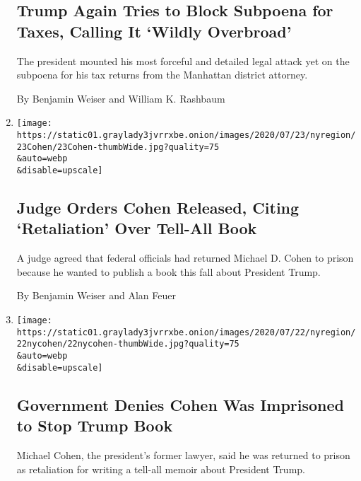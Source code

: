 \begin{enumerate}
{  \subsection{Trump Again Tries to Block Subpoena for Taxes, Calling It
  `Wildly
  Overbroad'}\label{trump-again-tries-to-block-subpoena-for-taxes-calling-it-wildly-overbroad}}

  The president mounted his most forceful and detailed legal attack yet
  on the subpoena for his tax returns from the Manhattan district
  attorney.

  By Benjamin Weiser and William K. Rashbaum
\item
  \href{/2020/07/23/nyregion/michael-cohen-trump-book.html}{}

  \texttt{[image: https://static01.graylady3jvrrxbe.onion/images/2020/07/23/nyregion/23Cohen/23Cohen-thumbWide.jpg?quality=75\\\&auto=webp\\\&disable=upscale]}

  \hypertarget{judge-orders-cohen-released-citing-retaliation-over-tell-all-book}{%
  \subsection{Judge Orders Cohen Released, Citing `Retaliation' Over
  Tell-All
  Book}\label{judge-orders-cohen-released-citing-retaliation-over-tell-all-book}}

  A judge agreed that federal officials had returned Michael D. Cohen to
  prison because he wanted to publish a book this fall about President
  Trump.

  By Benjamin Weiser and Alan Feuer
\item
  \href{/2020/07/22/nyregion/michael-cohen-donald-trump-prison.html}{}

  \texttt{[image: https://static01.graylady3jvrrxbe.onion/images/2020/07/22/nyregion/22nycohen/22nycohen-thumbWide.jpg?quality=75\\\&auto=webp\\\&disable=upscale]}

  \hypertarget{government-denies-cohen-was-imprisoned-to-stop-trump-book}{%
  \subsection{Government Denies Cohen Was Imprisoned to Stop Trump
  Book}\label{government-denies-cohen-was-imprisoned-to-stop-trump-book}}

  Michael Cohen, the president's former lawyer, said he was returned to
  prison as retaliation for writing a tell-all memoir about President
  Trump.


\end{enumerate}
